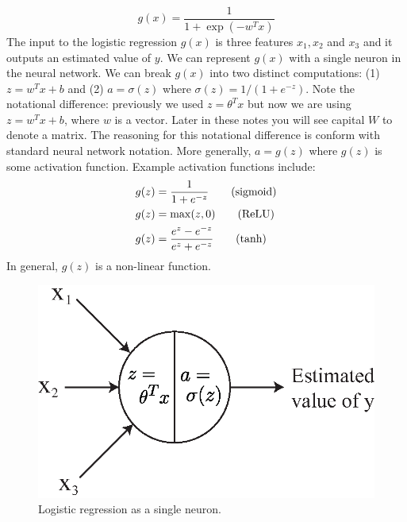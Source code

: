 \documentclass{article}
\numberwithin{equation}{section}
\begin{document}
\begin{equation*}
g(x) = \frac{1}{1+\exp(-w^T x)}
\end{equation*}
The input to the logistic regression $g(x)$ is three features $x_1, x_2$ and $x_3$ and it outputs an estimated value of $y$. We can represent $g(x)$ with a single neuron in the neural network. We can break $g(x)$ into two distinct computations: (1) $z= w^T x + b $ and (2) $a = \sigma(z)$ where $\sigma(z) = 1/(1+e^{-z})$. Note the notational difference: previously we used $z=\theta^T x$ but now we are using $z=w^T x + b$, where $w$ is a vector. Later in these notes you will see capital $W$ to denote a matrix. The reasoning for this notational difference is conform with standard neural network notation. More generally, $a= g(z)$ where $g(z)$ is some activation function. Example activation functions include:
\begin{align}
g(z) &= \frac{1}{1+e^{-z}} \textrm{\qquad (sigmoid)} \\
g(z) &= \max(z, 0) \textrm{\qquad (ReLU)} \\
g(z) &= \frac{e^z-e^{-z}}{e^z + e^{-z}} \textrm{\qquad (tanh)}
\end{align}
In general, $g(z)$ is a non-linear function.
\begin{figure}[h]
	\centering
	\includegraphics[width=0.5\linewidth]{single_neuron.eps}
	\caption{Logistic regression as a single neuron.}\label{fig:single}
\end{figure}
\end{document}
